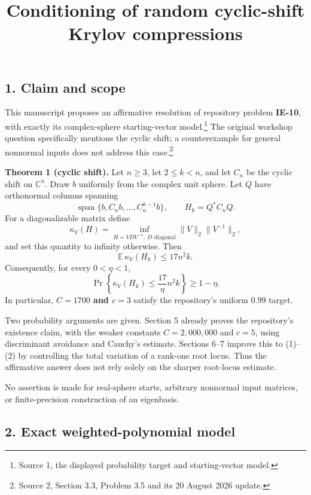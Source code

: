 \documentclass[
  11pt,
]{article}
\title{Conditioning of random cyclic-shift Krylov compressions}
\author{}
\date{}
\begin{document}
\maketitle

\subsection{1. Claim and scope}\label{claim-and-scope}

This manuscript proposes an affirmative resolution of repository problem
\textbf{IE-10}, with exactly its complex-sphere starting-vector
model.\footnote{Source 1, the displayed probability target and
  starting-vector model.} The original workshop question specifically
mentions the cyclic shift; a counterexample for general nonnormal inputs
does not address this case.\footnote{Source 2, Section 3.3, Problem 3.5
  and its 20 August 2026 update.}

\textbf{Theorem 1 (cyclic shift).} Let \(n\geq3\), let \(2\leq k<n\),
and let \(C_n\) be the cyclic shift on \(\mathbb C^n\). Draw \(b\)
uniformly from the complex unit sphere. Let \(Q\) have orthonormal
columns spanning \[
\operatorname{span}\{b,C_nb,\ldots,C_n^{k-1}b\},
\qquad H_k=Q^*C_nQ.
\] For a diagonalizable matrix define \[
\kappa_V(H)=\inf_{H=VDV^{-1},\ D\text{ diagonal}}\|V\|_2\|V^{-1}\|_2,
\] and set this quantity to infinity otherwise. Then \[
\mathbb E\,\kappa_V(H_k)\leq17n^2k. \tag{1}
\] Consequently, for every \(0<\eta<1\), \[
\Pr\left\{\kappa_V(H_k)\leq\frac{17}{\eta}n^2k\right\}\geq1-\eta. \tag{2}
\] In particular, \textbf{\(C=1700\) and \(c=3\)} satisfy the
repository's uniform \(0.99\) target.

Two probability arguments are given. Section 5 already proves the
repository's existence claim, with the weaker constants
\(C=2{,}000{,}000\) and \(c=5\), using discriminant avoidance and
Cauchy's estimate. Sections 6--7 improve this to (1)--(2) by controlling
the total variation of a rank-one root locus. Thus the affirmative
answer does not rely solely on the sharper root-locus estimate.

No assertion is made for real-sphere starts, arbitrary nonnormal input
matrices, or finite-precision construction of an eigenbasis.

\subsection{2. Exact weighted-polynomial
model}\label{exact-weighted-polynomial-model}
\end{document}
